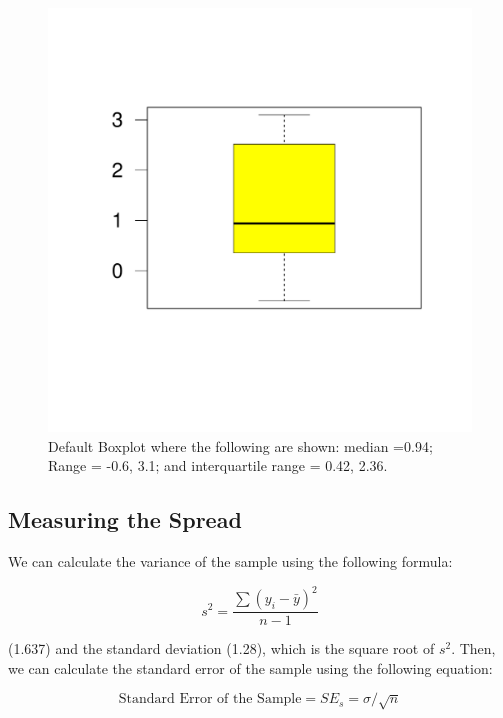 \documentclass{tufte-handout}\usepackage[]{graphicx}\usepackage[]{color}
\makeatletter
\def\maxwidth{ %
  \ifdim\Gin@nat@width>\linewidth
    \linewidth
  \else
    \Gin@nat@width
  \fi
}
\newenvironment{knitrout}{}{} %
\makeatother
\begin{document}
\begin{figure}
\caption{Default Boxplot where the following are shown: median =0.94; Range = -0.6, 3.1; and interquartile range = 0.42, 2.36.}
\label{fig:default_bp}
\begin{knitrout}
\color{fgcolor}
\includegraphics[width=\maxwidth]{figure/unnamed-chunk-6-1} 

\end{knitrout}
\end{figure}


\subsection{Measuring the Spread}

We can calculate the variance of the sample using the following formula: 

\begin{equation}
s^2 = \frac{\sum(y_i - \bar{y})^2}{n-1}
\end{equation}

\noindent (1.637) and the standard deviation (1.28), which is the square root of $s^2$. Then, we can calculate the standard error of the sample using the following equation: 

\begin{equation}
\textrm{Standard Error of the Sample} = SE_s = \sigma/\sqrt{n}
\end{equation}
\end{document}
